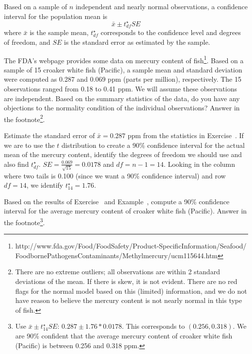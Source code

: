 \begin{termBox}{
Based on a sample of $n$ independent and nearly normal observations, a confidence interval for the population mean is
$$\bar{x} \pm t^{\star}_{df}SE$$
where $\bar{x}$ is the sample mean, $t^{\star}_{df}$ corresponds to the confidence level and degrees of freedom, and $SE$ is the standard error as estimated by the sample.}
\end{termBox}

\begin{exercise} \label{croakerWhiteFishPacificExerConditions}
The FDA's webpage provides some data on mercury content of fish\footnote{http://www.fda.gov/Food/FoodSafety/Product-SpecificInformation/Seafood/\\ FoodbornePathogensContaminants/Methylmercury/ucm115644.htm}. Based on a sample of 15 croaker white fish (Pacific), a sample mean and standard deviation were computed as 0.287 and 0.069 ppm (parts per million), respectively. The 15 observations ranged from 0.18 to 0.41 ppm. We will assume these observations are independent. Based on the summary statistics of the data, do you have any objections to the normality condition of the individual observations? Answer in the footnote\footnote{There are no extreme outliers; all observations are within 2 standard deviations of the mean. If there is skew, it is not evident. There are no red flags for the normal model based on this (limited) information, and we do not have reason to believe the mercury content is not nearly normal in this type of fish.}.
\end{exercise}

\vspace{5mm}

\begin{example}{Estimate the standard error of $\bar{x}=0.287$ ppm from the statistics in Exercise~. If we are to use the $t$ distribution to create a 90\% confidence interval for the actual mean of the mercury content, identify the degrees of freedom we should use and also find $t^{\star}_{df}$.}
\label{croakerWhiteFishPacificExerSEDFTStar}
$SE = \frac{0.069}{\sqrt{15}} = 0.0178$ and $df = n - 1 = 14$. Looking in the column where two tails is 0.100 (since we want a 90\% confidence interval) and row $df=14$, we identify $t^{\star}_{14} = 1.76$.
\end{example}

\begin{exercise}
Based on the results of Exercise~ and Example~, compute a 90\% confidence interval for the average mercury content of croaker white fish (Pacific). Answer in the footnote\footnote{Use $\bar{x} \pm t^{\star}_{14} SE$: $0.287 \pm 1.76*0.0178$. This corresponds to $(0.256, 0.318)$. We are 90\% confident that the average mercury content of croaker white fish (Pacific) is between 0.256 and 0.318 ppm.}.
\end{exercise}


